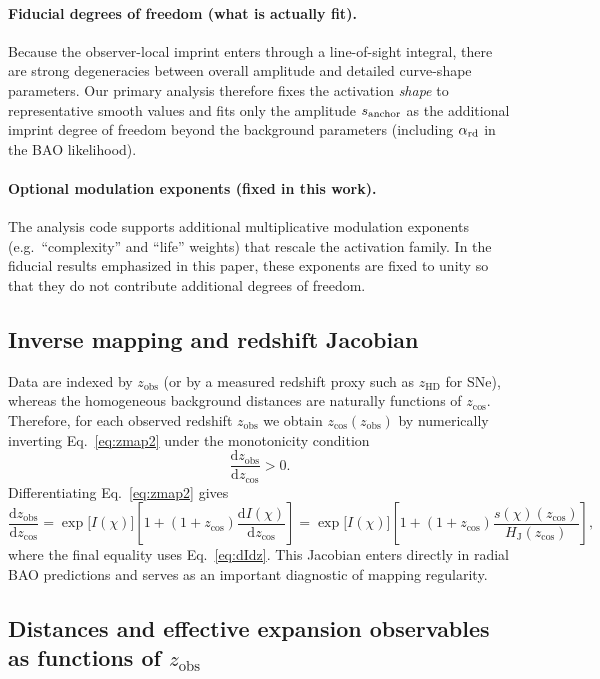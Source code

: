 \documentclass[10pt]{article}
\newcommand{\zobs}{z_{\mathrm{obs}}}
\newcommand{\zcos}{z_{\mathrm{cos}}}
\newcommand{\zhd}{z_{\mathrm{HD}}}
\newcommand{\chis}{\chi}
\newcommand{\Iofchi}{I(\chis)}
\newcommand{\sofchi}{s(\chis)}
\providecommand{\dd}{\mathrm{d}}
\newcommand{\HJ}{H_{\mathrm{J}}}
\begin{document}
\paragraph{Fiducial degrees of freedom (what is actually fit).}
Because the observer-local imprint enters through a line-of-sight integral, there are strong
degeneracies between overall amplitude and detailed curve-shape parameters. Our primary analysis
therefore fixes the activation \emph{shape} to representative smooth values and fits only the
amplitude $s_{\rm anchor}$ as the additional imprint degree of freedom beyond the background
parameters (including $\alpha_{\rm rd}$ in the BAO likelihood).

\paragraph{Optional modulation exponents (fixed in this work).}
The analysis code supports additional multiplicative modulation exponents (e.g.\ ``complexity'' and
``life'' weights) that rescale the activation family. In the fiducial results emphasized in this
paper, these exponents are fixed to unity so that they do not contribute additional degrees of freedom.

\subsection{Inverse mapping and redshift Jacobian}
\label{sec:inverse2}

Data are indexed by $\zobs$ (or by a measured redshift proxy such as $\zhd$ for SNe), whereas the
homogeneous background distances are naturally functions of $\zcos$.
Therefore, for each observed redshift $\zobs$ we obtain $\zcos(\zobs)$ by numerically inverting
Eq.~\eqref{eq:zmap2} under the monotonicity condition
\begin{equation}
\frac{\dd \zobs}{\dd \zcos} > 0.
\end{equation}
Differentiating Eq.~\eqref{eq:zmap2} gives
\begin{equation}
\frac{\dd \zobs}{\dd \zcos}
= \exp\!\bigl[\Iofchi\bigr]
\left[
1+(1+\zcos)\frac{\dd \Iofchi}{\dd \zcos}
\right]
= \exp\!\bigl[\Iofchi\bigr]
\left[
1+(1+\zcos)\frac{\sofchi(\zcos)}{\HJ(\zcos)}
\right],
\label{eq:jac_general2}
\end{equation}
where the final equality uses Eq.~\eqref{eq:dIdz}. This Jacobian enters directly in radial BAO
predictions and serves as an important diagnostic of mapping regularity.

\subsection{Distances and effective expansion observables as functions of $\zobs$}
\label{sec:obsfuncs}
\end{document}
